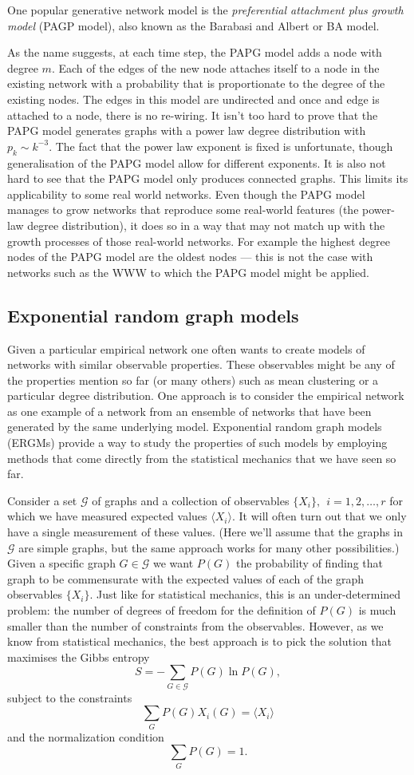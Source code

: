 One popular generative network model is the \emph{preferential attachment plus growth model} (PAGP model), also known as the Barabasi and Albert or BA model.

As the name suggests, at each time step, the PAPG model adds a node with degree $m$. Each of the edges of the new node attaches itself to a node in the existing network with a probability that is proportionate to the degree of the existing nodes. The edges in this model are undirected and once and edge is attached to a node, there is no re-wiring. It isn't too hard to prove that the PAPG model generates graphs with a power law degree distribution with $p_k \sim k^{-3}$. The fact that the power law exponent is fixed is unfortunate, though generalisation of the PAPG model allow for different exponents. It is also not hard to see that the PAPG model only produces connected graphs. This limits its applicability to some real world networks. Even though the PAPG model manages to grow networks that reproduce some real-world features (the power-law degree distribution), it does so in a way that may not match up with the growth processes of those real-world networks. For example the highest degree nodes of the PAPG model are the oldest nodes --- this is not the case with networks such as the WWW to which the PAPG model might be applied.


\subsection{Exponential random graph models}
Given a particular empirical network one often wants to create models of networks with similar observable properties. These observables might be any of the properties mention so far (or many others) such as mean clustering or a particular degree distribution. One approach is to consider the empirical network as one example of a network from an ensemble of networks that have been generated by the same underlying model. Exponential random graph models (ERGMs) provide a way to study the properties of such models by employing methods that come directly from the statistical mechanics that we have seen so far.

Consider a set $\mathcal{G}$ of graphs and a collection of observables $\{X_i\},~~i=1,2,\ldots,r$ for which we have measured expected values $\langle X_i\rangle$. It will often turn out that we only have a single measurement of these values. (Here we'll assume that the graphs in $\mathcal{G}$ are simple graphs, but the same approach works for many other possibilities.) Given a specific graph $G\in\mathcal{G}$ we want $P(G)$ the probability of finding that graph to be commensurate with the expected values of each of the graph observables $\{X_i\}$. Just like for statistical  mechanics, this is an under-determined problem: the number of degrees of freedom for the definition of $P(G)$ is much smaller than the number of constraints from the observables. However, as we know from statistical mechanics, the best approach is to pick the solution that maximises the Gibbs entropy
$$
	S= -\sum_{G\in\mathcal{G}}P(G)\ln P(G),
$$
subject to the constraints
$$
	\sum_G P(G)X_i(G) = \langle X_i\rangle
$$
and the normalization condition
$$
	\sum_G P(G) =1.
$$

